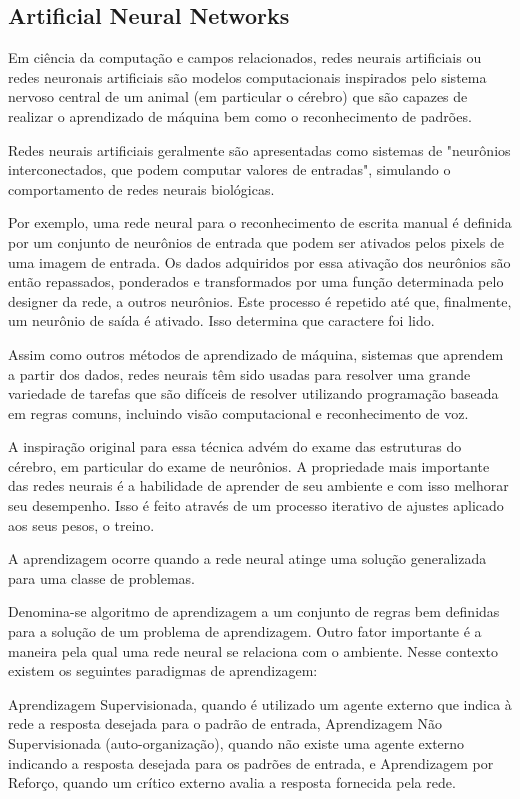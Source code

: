\documentclass{article}
\begin{document}
\subsection{Artificial Neural Networks}

Em ciência da computação e campos relacionados, redes neurais artificiais ou redes neuronais artificiais são modelos computacionais inspirados pelo sistema nervoso central de um animal (em particular o cérebro) que são capazes de realizar o aprendizado de máquina bem como o reconhecimento de padrões. 

Redes neurais artificiais geralmente são apresentadas como sistemas de "neurônios interconectados, que podem computar valores de entradas", simulando o comportamento de redes neurais biológicas.

Por exemplo, uma rede neural para o reconhecimento de escrita manual é definida por um conjunto de neurônios de entrada que podem ser ativados pelos pixels de uma imagem de entrada. Os dados adquiridos por essa ativação dos neurônios são então repassados, ponderados e transformados por uma função determinada pelo designer da rede, a outros neurônios. Este processo é repetido até que, finalmente, um neurônio de saída é ativado. Isso determina que caractere foi lido.

Assim como outros métodos de aprendizado de máquina, sistemas que aprendem a partir dos dados, redes neurais têm sido usadas para resolver uma grande variedade de tarefas que são difíceis de resolver utilizando programação baseada em regras comuns, incluindo visão computacional e reconhecimento de voz.

A inspiração original para essa técnica advém do exame das estruturas do cérebro, em particular do exame de neurônios. A propriedade mais importante das redes neurais é a habilidade de aprender de seu ambiente e com isso melhorar seu desempenho. Isso é feito através de um processo iterativo de ajustes aplicado aos seus pesos, o treino.

A aprendizagem ocorre quando a rede neural atinge uma solução generalizada para uma classe de problemas.

Denomina-se algoritmo de aprendizagem a um conjunto de regras bem definidas para a solução de um problema de aprendizagem. Outro fator importante é a maneira pela qual uma rede neural se relaciona com o ambiente. Nesse contexto existem os seguintes paradigmas de aprendizagem:

Aprendizagem Supervisionada, quando é utilizado um agente externo que indica à rede a resposta desejada para o padrão de entrada, Aprendizagem Não Supervisionada (auto-organização), quando não existe uma agente externo indicando a resposta desejada para os padrões de entrada, e Aprendizagem por Reforço, quando um crítico externo avalia a resposta fornecida pela rede.
\end{document}
